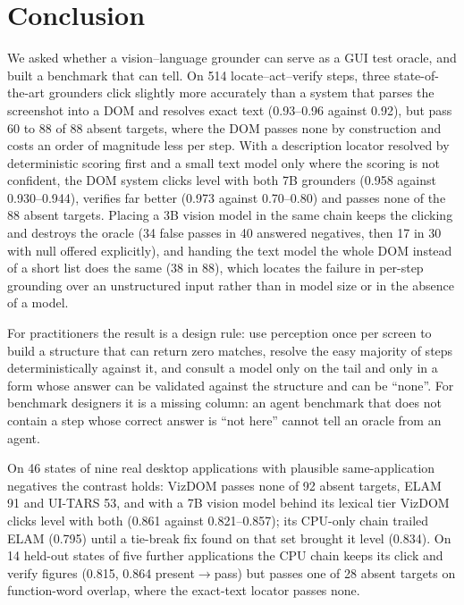 \documentclass[conference]{IEEEtran}
\begin{document}
\section{Conclusion}
We asked whether a vision--language grounder can serve as a GUI test oracle, and built a benchmark that can tell. On 514 locate--act--verify steps, three state-of-the-art grounders click slightly more accurately than a system that parses the screenshot into a DOM and resolves exact text (0.93--0.96 against 0.92), but pass 60 to 88 of 88 absent targets, where the DOM passes none by construction and costs an order of magnitude less per step. With a description locator resolved by deterministic scoring first and a small text model only where the scoring is not confident, the DOM system clicks level with both 7B grounders (0.958 against 0.930--0.944), verifies far better (0.973 against 0.70--0.80) and passes none of the 88 absent targets. Placing a 3B vision model in the same chain keeps the clicking and destroys the oracle (34 false passes in 40 answered negatives, then 17 in 30 with null offered explicitly), and handing the text model the whole DOM instead of a short list does the same (38 in 88), which locates the failure in per-step grounding over an unstructured input rather than in model size or in the absence of a model.

For practitioners the result is a design rule: use perception once per screen to build a structure that can return zero matches, resolve the easy majority of steps deterministically against it, and consult a model only on the tail and only in a form whose answer can be validated against the structure and can be ``none''. For benchmark designers it is a missing column: an agent benchmark that does not contain a step whose correct answer is ``not here'' cannot tell an oracle from an agent.

On 46 states of nine real desktop applications with plausible same-application negatives the contrast holds: VizDOM passes none of 92 absent targets, ELAM 91 and UI-TARS 53, and with a 7B vision model behind its lexical tier VizDOM clicks level with both (0.861 against 0.821--0.857); its CPU-only chain trailed ELAM (0.795) until a tie-break fix found on that set brought it level (0.834). On 14 held-out states of five further applications the CPU chain keeps its click and verify figures (0.815, 0.864 present$\rightarrow$pass) but passes one of 28 absent targets on function-word overlap, where the exact-text locator passes none.
\end{document}

